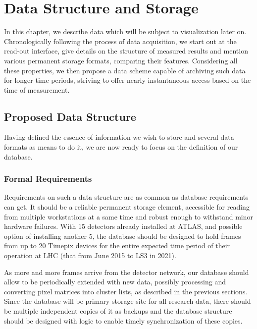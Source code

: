 \chapter{Data Structure and Storage}
In this chapter, we describe data which will be subject to visualization later on. Chronologically following the process of data acquisition, we start out at the read-out interface, give details on the structure of measured results and mention various permanent storage formats, comparing their features. Considering all these properties, we then propose a data scheme capable of archiving such data for longer time periods, striving to offer nearly instantaneous access based on the time of measurement.






\section{Proposed Data Structure}
Having defined the essence of information we wish to store and several data formats as means to do it, we are now ready to focus on the definition of our database. 

\subsection{Formal Requirements}
Requirements on such a data structure are as common as database requirements can get. It should be a reliable permanent storage element, accessible for reading from multiple workstations at a same time and robust enough to withstand minor hardware failures. With 15 detectors already installed at ATLAS, and possible option of installing another 5, the database should be designed to hold frames from up to 20 Timepix devices for the entire expected time period of their operation at LHC (that from June 2015 to LS3 in 2021).


As more and more frames arrive from the detector network, our database should allow to be periodically extended with new data, possibly processing and converting pixel matrices into cluster lists, as described in the previous sections. Since the database will be primary storage site for all research data, there should be multiple independent copies of it as backups and the database structure should be designed with logic to enable timely synchronization of these copies.

